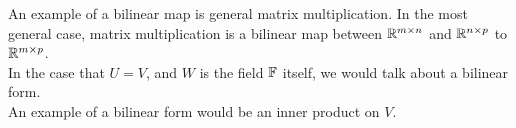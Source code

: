         An example of a bilinear map is general matrix multiplication. In the most general case, matrix multiplication is a bilinear map between $\mathbb{R}^{m \times n}$ and $\mathbb{R}^{n \times p}$ to $\mathbb{R}^{m \times p}$. \\

        In the case that $U=V$, and $W$ is the field $\mathbb{F}$ itself, we would talk about a bilinear form. \\

        An example of a bilinear form would be an inner product on $V$. \\
